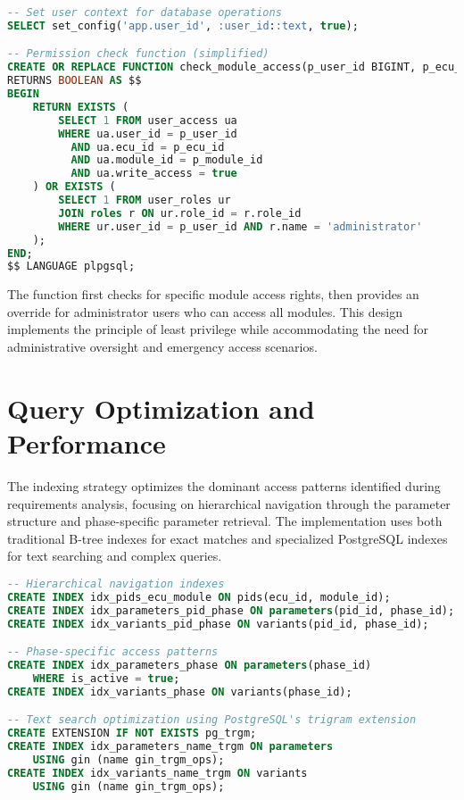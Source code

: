 \begin{lstlisting}[language=SQL, caption={Database Security Context}, label={lst:security-context}]
-- Set user context for database operations
SELECT set_config('app.user_id', :user_id::text, true);

-- Permission check function (simplified)
CREATE OR REPLACE FUNCTION check_module_access(p_user_id BIGINT, p_ecu_id INTEGER, p_module_id INTEGER)
RETURNS BOOLEAN AS $$
BEGIN
    RETURN EXISTS (
        SELECT 1 FROM user_access ua 
        WHERE ua.user_id = p_user_id 
          AND ua.ecu_id = p_ecu_id 
          AND ua.module_id = p_module_id 
          AND ua.write_access = true
    ) OR EXISTS (
        SELECT 1 FROM user_roles ur 
        JOIN roles r ON ur.role_id = r.role_id 
        WHERE ur.user_id = p_user_id AND r.name = 'administrator'
    );
END;
$$ LANGUAGE plpgsql;
\end{lstlisting}

The function first checks for specific module access rights, then provides an override for administrator users who can access all modules. This design implements the principle of least privilege while accommodating the need for administrative oversight and emergency access scenarios.

\section{Query Optimization and Performance}
\label{sec:query-optimization}

The indexing strategy optimizes the dominant access patterns identified during requirements analysis, focusing on hierarchical navigation through the parameter structure and phase-specific parameter retrieval. The implementation uses both traditional B-tree indexes for exact matches and specialized PostgreSQL indexes for text searching and complex queries.

\begin{lstlisting}[language=SQL, caption={Strategic Index Implementation}, label={lst:strategic-indexing}]
-- Hierarchical navigation indexes
CREATE INDEX idx_pids_ecu_module ON pids(ecu_id, module_id);
CREATE INDEX idx_parameters_pid_phase ON parameters(pid_id, phase_id);
CREATE INDEX idx_variants_pid_phase ON variants(pid_id, phase_id);

-- Phase-specific access patterns
CREATE INDEX idx_parameters_phase ON parameters(phase_id) 
    WHERE is_active = true;
CREATE INDEX idx_variants_phase ON variants(phase_id);

-- Text search optimization using PostgreSQL's trigram extension
CREATE EXTENSION IF NOT EXISTS pg_trgm;
CREATE INDEX idx_parameters_name_trgm ON parameters 
    USING gin (name gin_trgm_ops);
CREATE INDEX idx_variants_name_trgm ON variants 
    USING gin (name gin_trgm_ops);
\end{lstlisting}

